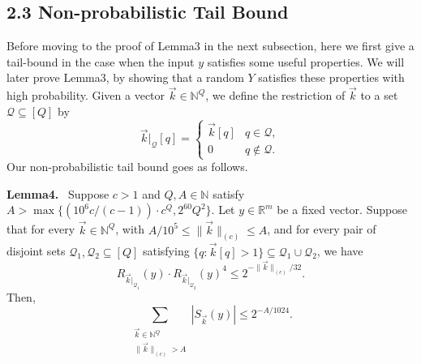 \documentclass[10pt,a4paper]{article}
\newenvironment{authorclaim}[1]{\par\medskip\noindent\textbf{#1.}\ \ignorespaces}{\par\medskip}
\begin{document}
\subsection*{2.3 Non-probabilistic Tail Bound}
Before moving to the proof of Lemma3 in the next subsection, here we first give a tail-bound in the case when the input $y$ satisfies some useful properties. We will later prove Lemma3, by showing that a random $Y$ satisfies these properties with high probability. Given a vector $\vec k\in\mathbb N^Q$, we define the restriction of $\vec k$ to a set $\mathcal Q\subseteq[Q]$ by
\[
\vec k|_{\mathcal Q}[q]=\begin{cases}\vec k[q]&q\in\mathcal Q,\\0&q\notin\mathcal Q.\end{cases}
\]
Our non-probabilistic tail bound goes as follows.
\begin{authorclaim}{Lemma4}
Suppose $c>1$ and $Q,A\in\mathbb N$ satisfy $A>\max\{(10^6c/(c-1))\cdot c^Q,2^{60}Q^2\}$. Let $y\in\mathbb R^m$ be a fixed vector. Suppose that for every $\vec k\in\mathbb N^Q$, with $A/10^5\le\|\vec k\|_{(c)}\le A$, and for every pair of disjoint sets $\mathcal Q_1,\mathcal Q_2\subseteq[Q]$ satisfying $\{q:\vec k[q]>1\}\subseteq\mathcal Q_1\cup\mathcal Q_2$, we have
\[
R_{\vec k|_{\mathcal Q_1}}(y)\cdot R_{\vec k|_{\mathcal Q_2}}(y)^4\le2^{-\|\vec k\|_{(c)}/32}.
\]
Then,
\[
\sum_{\substack{\vec k\in\mathbb N^Q\\\|\vec k\|_{(c)}>A}}|S_{\vec k}(y)|\le2^{-A/1024}.
\]
\end{authorclaim}
\end{document}
